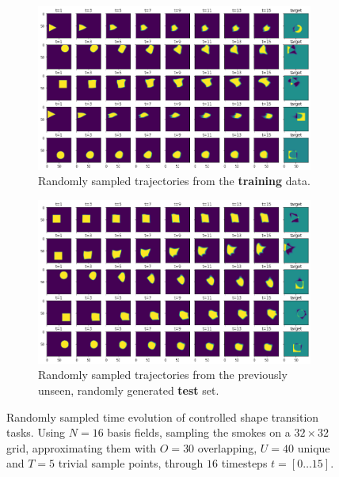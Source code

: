 \begin{figure}
  \centering
  \begin{subfigure}{\textwidth}
    \centering
    \includegraphics[width=\textwidth]{figures/nn-final/trained_trajectories_horizontal.png}
    \caption{Randomly sampled trajectories from the \textbf{training} data.}
  \end{subfigure}
  \begin{subfigure}{\textwidth}
    \centering
    \includegraphics[width=\textwidth]{figures/nn-final/test_trajectories_horizontal.png}
    \caption{Randomly sampled trajectories from the previously unseen, randomly
    generated \textbf{test} set.}
  \end{subfigure}
  \caption{Randomly sampled time evolution of controlled shape transition
  tasks. Using $N=16$ basis fields, sampling the smokes on a $32\times 32$ grid,
  approximating them with $O=30$ overlapping, $U=40$ unique and $T=5$ trivial
  sample points, through $16$ timesteps $t=[0\dots15]$.}
  \label{fig:NN-shape-transition}
\end{figure}
